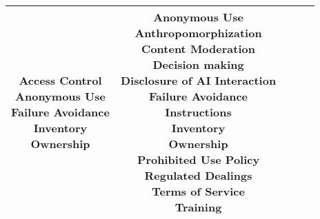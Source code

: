 \documentclass[fleqn]{article}
\begin{document}
\begin{landscape}
\begin{table}[H]
\begin{tabular}{|c|c|c|c|c|}
{			\textbullet\hspace{3pt} Access Control\\ 	
			\textbullet\hspace{3pt} Anonymous Use\\ 	
			\textbullet\hspace{3pt} Failure Avoidance\\ 	
			\textbullet\hspace{3pt} Inventory\\ 	
			\textbullet\hspace{3pt} Ownership\\ 	
		} &
		\makecell[l]{ 	
			\textbullet\hspace{3pt} Anonymous Use\\ 	
			\textbullet\hspace{3pt} Anthropomorphization\\ 	
			\textbullet\hspace{3pt} Content Moderation\\ 	
			\textbullet\hspace{3pt} Decision making\\ 	
			\textbullet\hspace{3pt} Disclosure of AI Interaction\\ 	
			\textbullet\hspace{3pt} Failure Avoidance\\ 	
			\textbullet\hspace{3pt} Instructions\\ 	
			\textbullet\hspace{3pt} Inventory\\ 	
			\textbullet\hspace{3pt} Ownership\\ 	
			\textbullet\hspace{3pt} Prohibited Use Policy\\ 	
			\textbullet\hspace{3pt} Regulated Dealings\\ 	
			\textbullet\hspace{3pt} Terms of Service\\ 	
			\textbullet\hspace{3pt} Training\\
		}
		\\
		\hline
	\end{tabular}
	\label{table:low_risk_plan_by_gai_risk_cont}
\end{table}

\vfill
\raisebox{-10pt}{\makebox[\linewidth]{\thepage}}

\end{landscape}
\end{document}
